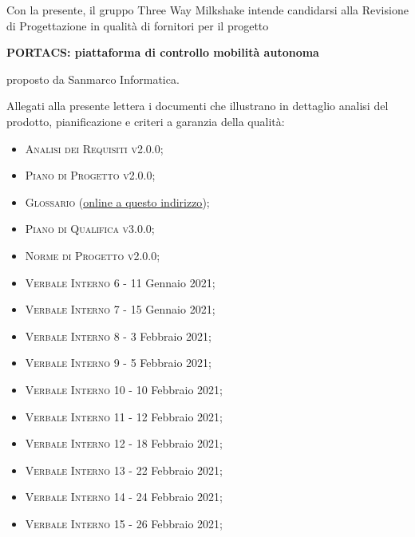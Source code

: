 \documentclass[10pt,stdletter,dateno,sigright]{newlfm}  %
\begin{document}
    \begin{newlfm}


        Con la presente, il gruppo Three Way Milkshake intende candidarsi alla Revisione di Progettazione in qualità di fornitori per il progetto
        \begin{center}
            \textbf{PORTACS: piattaforma di controllo mobilità autonoma}
        \end{center}
        proposto da Sanmarco Informatica.

        Allegati alla presente lettera i documenti che illustrano in dettaglio analisi del prodotto, pianificazione e criteri a garanzia della qualità:
	\begin{multicols}{2}
        \begin{itemize}
            \item \textsc{Analisi dei Requisiti v2.0.0;}
            \item \textsc{Piano di Progetto v2.0.0;}
            \item \textsc{Glossario }(\href{https://github.com/Three-Way-Milkshake/docs/wiki/Glossario}{\underline{online a questo indirizzo}});
            \item \textsc{Piano di Qualifica v3.0.0;}
            \item \textsc{Norme di Progetto v2.0.0;}
            \item \textsc{Verbale Interno 6} - 11 Gennaio 2021;
            \item \textsc{Verbale Interno 7} - 15 Gennaio 2021;
            \item \textsc{Verbale Interno 8} - 3 Febbraio 2021;
            \item \textsc{Verbale Interno 9} - 5 Febbraio 2021;
            \item \textsc{Verbale Interno 10} - 10 Febbraio 2021;
            \item \textsc{Verbale Interno 11} - 12 Febbraio 2021;
            \item \textsc{Verbale Interno 12} - 18 Febbraio 2021;
            \item \textsc{Verbale Interno 13} - 22 Febbraio 2021;
            \item \textsc{Verbale Interno 14} - 24 Febbraio 2021;
            \item \textsc{Verbale Interno 15} - 26 Febbraio 2021;

\end{itemize}
\end{multicols}
\end{newlfm}
\end{document}
